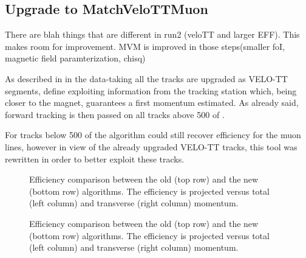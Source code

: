 
\subsection{Upgrade to MatchVeloTTMuon}
\label{sec:matchvelottmuon}
There are blah things that are different in run2 (veloTT and larger EFF). This makes room for improvement.
MVM is improved in those steps(smaller foI, magnetic field paramterization, chisq)

As described in \cite{LHCb-PUB-2015-005} in the \runtwo data-taking all the tracks are upgraded as VELO-TT segments, {\color{red} define}
exploiting information from the \ttracker tracking station which, being closer to the magnet,
guarantees a first momentum estimated. As already said, forward tracking is then passed on
all tracks above 500 \mevc of \pt.

For tracks below 500 \mevc of \pt the \mvm algorithm could still recover efficiency for the muon lines,
however in view of the already upgraded VELO-TT tracks, this tool was rewritten in order to better exploit these tracks.


\begin{figure}[h]
  \centering
  \begin{subfigure}{0.5\textwidth}
    \scalebox{.6}{}
    \caption{}
    \label{mvTTm_eff_p}
  \end{subfigure}%
  \hfill%
  \begin{subfigure}{0.5\textwidth}
    \scalebox{.6}{}
    \caption{}
    \label{mvm_eff_p}
  \end{subfigure}
  \caption{Efficiency comparison between the old \mvm (top row) and the new \mvTTm (bottom row) algorithms.
 The efficiency is projected versus total (left column) and transverse (right column) momentum.  }
 \label{mvm_eff_p_comp}
\end{figure}

\begin{figure}[h]
  \centering
  \begin{subfigure}{0.5\textwidth}
    \scalebox{.6}{}
    \caption{}
    \label{mvTTm_eff_p}
  \end{subfigure}%
  \hfill%
  \begin{subfigure}{0.5\textwidth}
    \scalebox{.6}{}
    \caption{}
    \label{mvm_eff_p}
  \end{subfigure}
  \caption{Efficiency comparison between the old \mvm (top row) and the new \mvTTm (bottom row) algorithms.
 The efficiency is projected versus total (left column) and transverse (right column) momentum.  }
 \label{mvm_eff_p_comp}
\end{figure}

